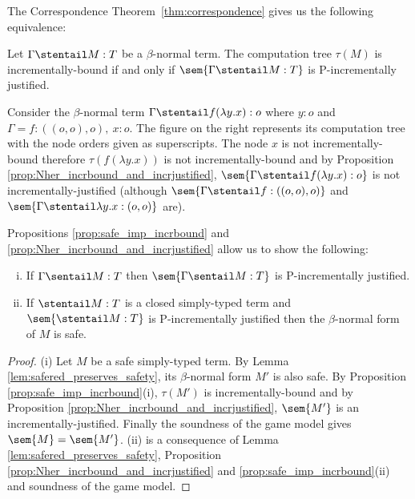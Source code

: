 The Correspondence Theorem~\ref{thm:correspondence}
gives us the following equivalence:
\begin{proposition} %
\label{prop:Nher_incrbound_and_incrjustified} Let $\Gamma \stentail
M : T$ be a $\beta$-normal term. The computation tree $\tau(M)$ is
incrementally-bound if and only if $\sem{\Gamma \stentail M : T}$ is
P-incrementally justified.
\end{proposition}


\begin{example}
Consider the $\beta$-normal term $\Gamma\stentail f (\lambda y .x) :
o$ where $y:o$ and $\Gamma =f:((o,o),o),~x:o$. The figure on the
right represents its computation tree with the node orders given as
superscripts.  The node $x$ is not incrementally-bound therefore $\tau(f
(\lambda y .x))$ is not incrementally-bound and by Proposition
\ref{prop:Nher_incrbound_and_incrjustified}, $\sem{\Gamma \stentail
f (\lambda y .x) : o}$ is not incrementally-justified (although
$\sem{\Gamma \stentail f : ((o,o),o)}$ and $\sem{\Gamma \stentail
\lambda
  y. x : (o,o)}$ are).
\end{example}
\smallskip

Propositions \ref{prop:safe_imp_incrbound} and
\ref{prop:Nher_incrbound_and_incrjustified} allow us to show the
following:
\begin{theorem}
\label{thm:safeincrejust} \hfill
\begin{enumerate}[(i)]
\item If $\Gamma \sentail M : T$ then $\sem{\Gamma \sentail M : T}$ is P-incrementally justified.
\item If $\stentail M : T$ is a closed simply-typed term and $\sem{\stentail M : T}$ is P-incrementally justified then the $\beta$-normal form of $M$ is safe.
\end{enumerate}
\end{theorem}
\begin{proof} (i) Let $M$ be a safe simply-typed term. By Lemma
\ref{lem:safered_preserves_safety}, its $\beta$-normal form $M'$ is
also safe. By Proposition \ref{prop:safe_imp_incrbound}(i),
$\tau(M')$ is incrementally-bound and by Proposition
\ref{prop:Nher_incrbound_and_incrjustified}, $\sem{M'}$ is an
incrementally-justified. Finally the soundness of the game model
gives $\sem{M} = \sem{M'}$.  (ii) is a consequence of Lemma
\ref{lem:safered_preserves_safety}, Proposition
\ref{prop:Nher_incrbound_and_incrjustified} and
\ref{prop:safe_imp_incrbound}(ii) and soundness of the game model.
\end{proof}


